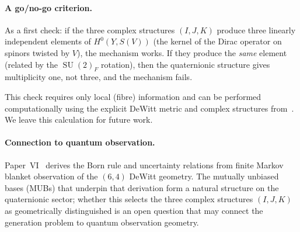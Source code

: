 \documentclass[12pt,a4paper]{article}
\theoremstyle{definition}
\newcommand{\SU}{\operatorname{SU}}
\begin{document}
\paragraph{A go/no-go criterion.}
As a first check: if the three complex structures $(I, J, K)$ produce three linearly independent elements of $H^0(Y, S(V))$ (the kernel of the Dirac operator on spinors twisted by $V$), the mechanism works.
If they produce the \emph{same} element (related by the $\SU(2)_F$ rotation), then the quaternionic structure gives multiplicity one, not three, and the mechanism fails.

This check requires only local (fibre) information and can be performed computationally using the explicit DeWitt metric and complex structures from~\cite{Paper2}.
We leave this calculation for future work.

\paragraph{Connection to quantum observation.}
Paper~VI~\cite{Paper6} derives the Born rule and uncertainty relations from finite Markov blanket observation of the $(6,4)$ DeWitt geometry.
The mutually unbiased bases (MUBs) that underpin that derivation form a natural structure on the quaternionic sector; whether this selects the three complex structures $(I, J, K)$ as geometrically distinguished is an open question that may connect the generation problem to quantum observation geometry.




\end{document}
